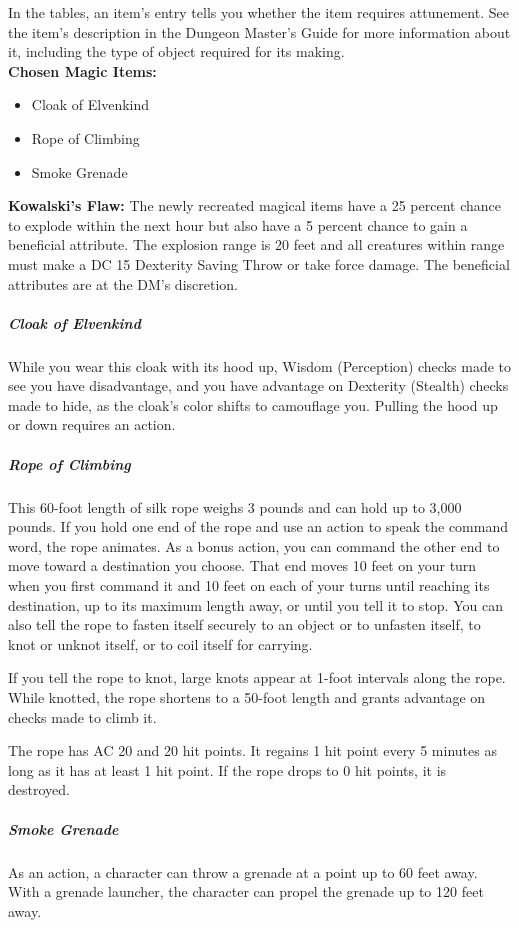 {In the tables, an item's entry tells you whether the item requires attunement. See the item's description in the Dungeon Master's Guide for more information about it, including the type of object required for its making.\\
\textbf{Chosen Magic Items:}
\begin{itemize}
	\item Cloak of Elvenkind
	\item Rope of Climbing
	\item Smoke Grenade
\end{itemize}
\textbf{Kowalski's Flaw:} The newly recreated magical items have a 25 percent chance to explode within the next hour but also have a 5 percent chance to gain a beneficial attribute. The explosion range is 20 feet and all creatures within range must make a DC 15 Dexterity Saving Throw or take  force damage. The beneficial attributes are at the DM's discretion.\\
\subparagraph*{Cloak of Elvenkind}
While you wear this cloak with its hood up, Wisdom (Perception) checks made to see you have disadvantage, and you have advantage on Dexterity (Stealth) checks made to hide, as the cloak's color shifts to camouflage you. Pulling the hood up or down requires an action.\\
\subparagraph*{Rope of Climbing}
This 60-foot length of silk rope weighs 3 pounds and can hold up to 3,000 pounds. If you hold one end of the rope and use an action to speak the command word, the rope animates. As a bonus action, you can command the other end to move toward a destination you choose. That end moves 10 feet on your turn when you first command it and 10 feet on each of your turns until reaching its destination, up to its maximum length away, or until you tell it to stop. You can also tell the rope to fasten itself securely to an object or to unfasten itself, to knot or unknot itself, or to coil itself for carrying.

If you tell the rope to knot, large knots appear at 1-foot intervals along the rope. While knotted, the rope shortens to a 50-foot length and grants advantage on checks made to climb it.

The rope has AC 20 and 20 hit points. It regains 1 hit point every 5 minutes as long as it has at least 1 hit point. If the rope drops to 0 hit points, it is destroyed.\\
\subparagraph*{Smoke Grenade}
As an action, a character can throw a grenade at a point up to 60 feet away. With a grenade launcher, the character can propel the grenade up to 120 feet away.

}
